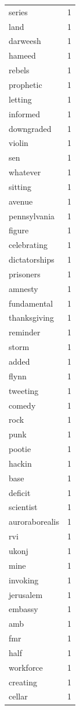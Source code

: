 \begin{tabular}{lr}
series & 1 \\
land & 1 \\
darweesh & 1 \\
hameed & 1 \\
rebels & 1 \\
prophetic & 1 \\
letting & 1 \\
informed & 1 \\
downgraded & 1 \\
violin & 1 \\
sen & 1 \\
whatever & 1 \\
sitting & 1 \\
avenue & 1 \\
pennsylvania & 1 \\
figure & 1 \\
celebrating & 1 \\
dictatorships & 1 \\
prisoners & 1 \\
amnesty & 1 \\
fundamental & 1 \\
thanksgiving & 1 \\
reminder & 1 \\
storm & 1 \\
added & 1 \\
flynn & 1 \\
tweeting & 1 \\
comedy & 1 \\
rock & 1 \\
punk & 1 \\
pootie & 1 \\
hackin & 1 \\
base & 1 \\
deficit & 1 \\
scientist & 1 \\
auroraborealis & 1 \\
rvi & 1 \\
ukonj & 1 \\
mine & 1 \\
invoking & 1 \\
jerusalem & 1 \\
embassy & 1 \\
amb & 1 \\
fmr & 1 \\
half & 1 \\
workforce & 1 \\
creating & 1 \\
cellar & 1 \\

\end{tabular}
